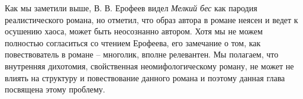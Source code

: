 \documentclass[12pt,a4paper]{article}
\begin{document}




Как мы заметили выше, В. В. Ерофеев видел \emph{Мелкий бес} как пародия реалистического романа, но отметил, что образ автора в романе неясен и ведет к осушению хаоса, может быть неосознанно автором. Хотя мы не можем полностью согласиться со чтением Ерофеева, его замечание о том, как повествователь в романе – многолик, вполне релевантен. Мы полагаем, что внутренняя дихотомия, свойственная неомифологическому роману, не может не влиять на структуру и повествование данного романа и поэтому данная глава посвящена этому проблему.


%



\end{document}
